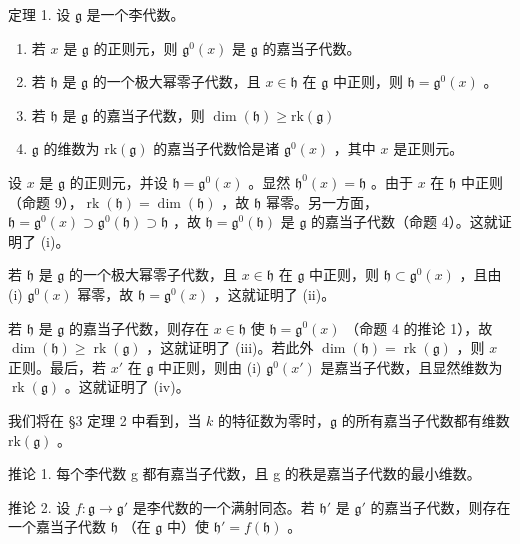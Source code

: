 定理 1. 设 \(\mathfrak{g}\) 是一个李代数。

\begin{enumerate}
\def\labelenumi{(\roman{enumi})}
\item
  若 \(x\) 是 \(\mathfrak{g}\) 的正则元，则 \(\mathfrak{g}^0(x)\) 是 \(\mathfrak{g}\) 的嘉当子代数。
\item
  若 \(\mathfrak{h}\) 是 \(\mathfrak{g}\) 的一个极大幂零子代数，且 \(x \in \mathfrak{h}\) 在 \(\mathfrak{g}\) 中正则，则 \(\mathfrak{h} = \mathfrak{g}^0(x)\) 。
\item
  若 \(\mathfrak{h}\) 是 \(\mathfrak{g}\) 的嘉当子代数，则 \(\dim (\mathfrak{h})\geq \mathrm{rk}(\mathfrak{g})\)
\item
  \(\mathfrak{g}\) 的维数为 \(\mathrm{rk}(\mathfrak{g})\) 的嘉当子代数恰是诸 \(\mathfrak{g}^0 (x)\) ，其中 \(x\) 是正则元。
\end{enumerate}

设 \(x\) 是 \(\mathfrak{g}\) 的正则元，并设 \(\mathfrak{h} = \mathfrak{g}^0(x)\) 。显然 \(\mathfrak{h}^0(x) = \mathfrak{h}\) 。由于 \(x\) 在 \(\mathfrak{h}\) 中正则（命题 9），\(\operatorname{rk}(\mathfrak{h}) = \dim(\mathfrak{h})\) ，故 \(\mathfrak{h}\) 幂零。另一方面，\(\mathfrak{h} = \mathfrak{g}^0(x) \supset \mathfrak{g}^0(\mathfrak{h}) \supset \mathfrak{h}\) ，故 \(\mathfrak{h} = \mathfrak{g}^0(\mathfrak{h})\) 是 \(\mathfrak{g}\) 的嘉当子代数（命题 4）。这就证明了 (i)。

若 \(\mathfrak{h}\) 是 \(\mathfrak{g}\) 的一个极大幂零子代数，且 \(x\in \mathfrak{h}\) 在 \(\mathfrak{g}\) 中正则，则 \(\mathfrak{h}\subset \mathfrak{g}^0 (x)\) ，且由 (i) \(\mathfrak{g}^0 (x)\) 幂零，故 \(\mathfrak{h} = \mathfrak{g}^0 (x)\) ，这就证明了 (ii)。

若 \(\mathfrak{h}\) 是 \(\mathfrak{g}\) 的嘉当子代数，则存在 \(x \in \mathfrak{h}\) 使 \(\mathfrak{h} = \mathfrak{g}^0(x)\) （命题 4 的推论 1），故 \(\dim(\mathfrak{h}) \geq \operatorname{rk}(\mathfrak{g})\) ，这就证明了 (iii)。若此外 \(\dim(\mathfrak{h}) = \operatorname{rk}(\mathfrak{g})\) ，则 \(x\) 正则。最后，若 \(x'\) 在 \(\mathfrak{g}\) 中正则，则由 (i) \(\mathfrak{g}^0(x')\) 是嘉当子代数，且显然维数为 \(\operatorname{rk}(\mathfrak{g})\) 。这就证明了 (iv)。

我们将在 §3 定理 2 中看到，当 \(k\) 的特征数为零时，\(\mathfrak{g}\) 的所有嘉当子代数都有维数 \(\mathrm{rk}(\mathfrak{g})\) 。

推论 1. 每个李代数 g 都有嘉当子代数，且 g 的秩是嘉当子代数的最小维数。

推论 2. 设 \(f: \mathfrak{g} \to \mathfrak{g}'\) 是李代数的一个满射同态。若 \(\mathfrak{h}'\) 是 \(\mathfrak{g}'\) 的嘉当子代数，则存在一个嘉当子代数 \(\mathfrak{h}\) （在 \(\mathfrak{g}\) 中）使 \(\mathfrak{h}' = f(\mathfrak{h})\) 。

